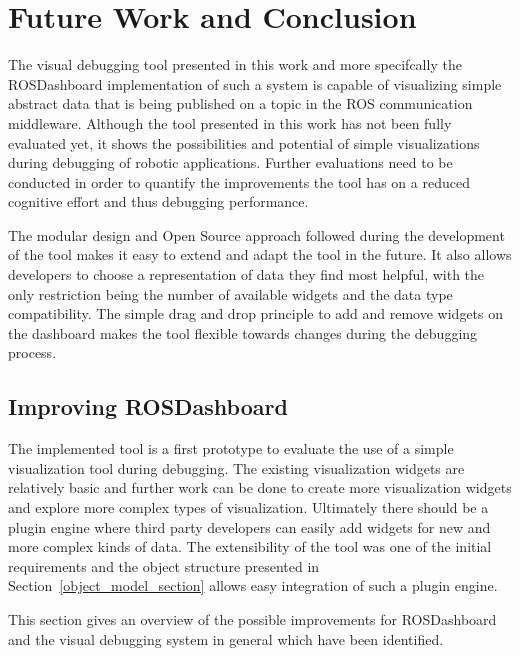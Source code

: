 \chapter{Future Work and Conclusion}
\label{future_work}

The visual debugging tool presented in this work and more specifcally the ROSDashboard implementation of such a system is capable of visualizing simple abstract data that is being published on a topic in the ROS communication middleware. Although the tool presented in this work has not been fully evaluated yet, it shows the possibilities and potential of simple visualizations during debugging of robotic applications. Further evaluations need to be conducted in order to quantify the improvements the tool has on a reduced cognitive effort and thus debugging performance.

The modular design and Open Source approach followed during the development of the tool makes it easy to extend and adapt the tool in the future. It also allows developers to choose a representation of data they find most helpful, with the only restriction being the number of available widgets and the data type compatibility. The simple drag and drop principle to add and remove widgets on the dashboard makes the tool flexible towards changes during the debugging process.



\section{Improving ROSDashboard}
The implemented tool is a first prototype to evaluate the use of a simple visualization tool during debugging. The existing visualization widgets are relatively basic and further work can be done to create more visualization widgets and explore more complex types of visualization. Ultimately there should be a plugin engine where third party developers can easily add widgets for new and more complex kinds of data. The extensibility of the tool was one of the initial requirements and the object structure presented in Section~\ref{object_model_section} allows easy integration of such a plugin engine.

This section gives an overview of the possible improvements for ROSDashboard and the visual debugging system in general which have been identified.

